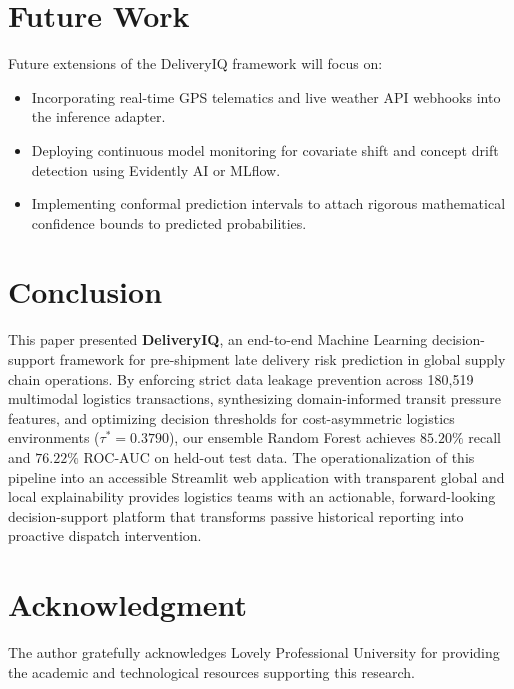 \documentclass[journal,10pt,twocolumn]{IEEEtran}
\begin{document}
\section{Future Work}
\label{sec:future_work}

Future extensions of the DeliveryIQ framework will focus on:
\begin{itemize}
    \item Incorporating real-time GPS telematics and live weather API webhooks into the inference adapter.
    \item Deploying continuous model monitoring for covariate shift and concept drift detection using Evidently AI or MLflow.
    \item Implementing conformal prediction intervals to attach rigorous mathematical confidence bounds to predicted probabilities.
\end{itemize}

\section{Conclusion}
\label{sec:conclusion}

This paper presented \textbf{DeliveryIQ}, an end-to-end Machine Learning decision-support framework for pre-shipment late delivery risk prediction in global supply chain operations. By enforcing strict data leakage prevention across 180,519 multimodal logistics transactions, synthesizing domain-informed transit pressure features, and optimizing decision thresholds for cost-asymmetric logistics environments ($\tau^* = 0.3790$), our ensemble Random Forest achieves $85.20\%$ recall and $76.22\%$ ROC-AUC on held-out test data. The operationalization of this pipeline into an accessible Streamlit web application with transparent global and local explainability provides logistics teams with an actionable, forward-looking decision-support platform that transforms passive historical reporting into proactive dispatch intervention.

\section*{Acknowledgment}
The author gratefully acknowledges Lovely Professional University for providing the academic and technological resources supporting this research.



\end{document}
